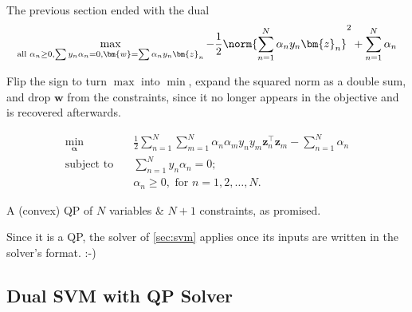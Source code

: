 The previous section ended with the dual
\[
    \max_{\text{all } \alpha_n \ge 0, \sum y_n \alpha_n = 0, \bm{w} = \sum
    \alpha_n y_n \bm{z}_n} -\frac{1}{2} \norm{\sum_{n=1}^N \alpha_n y_n
    \bm{z}_n}^2 + \sum_{n=1}^N \alpha_n
\]

Flip the sign to turn \(\max\) into \(\min\), expand the squared norm as a
double sum, and drop \(\bm{w}\) from the constraints, since it no longer
appears in the objective and is recovered afterwards.

\begin{definition}
    \[
        \begin{aligned}
            \min_{\bm{\alpha}} \quad & \frac{1}{2} \sum_{n=1}^N \sum_{m=1}^N
                \alpha_n \alpha_m y_n y_m \bm{z}_n^\top \bm{z}_m -
                \sum_{n=1}^N \alpha_n\\
            \text{subject to} \quad & \sum_{n=1}^N y_n \alpha_n = 0;\\
            & \alpha_n \ge 0, \text{ for } n = 1, 2, \dots , N.
        \end{aligned}
    \]
\end{definition}

\begin{moral}
    A (convex) QP of \(N\) variables \& \(N + 1\) constraints, as promised.
\end{moral}

Since it is a QP, the solver of \autoref{sec:svm} applies once its inputs
are written in the solver's format. :-)

\subsection{Dual SVM with QP Solver}

